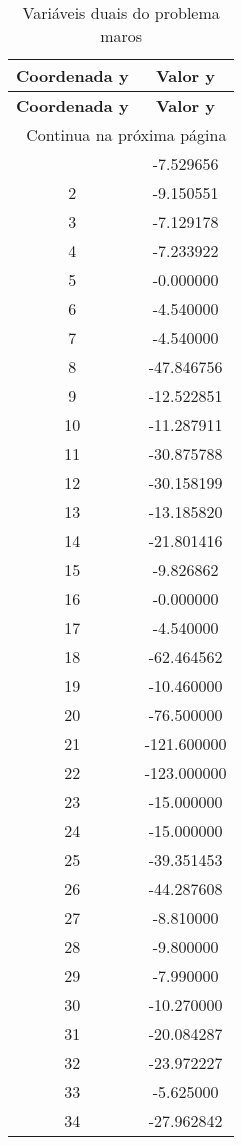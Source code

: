\documentclass[12pt]{article}
\begin{document}
\begin{longtable}{@{}cc@{}}
\caption{Variáveis duais do problema maros} \\
\toprule
\textbf{Coordenada y} & \textbf{Valor y} \\
\midrule
\endfirsthead

\toprule
\textbf{Coordenada y} & \textbf{Valor y} \\
\midrule
\endhead

\midrule \multicolumn{2}{r}{{Continua na próxima página}} \\ \midrule
\endfoot

\bottomrule
\endlastfoot
1 & -7.529656 \\
2 & -9.150551 \\
3 & -7.129178 \\
4 & -7.233922 \\
5 & -0.000000 \\
6 & -4.540000 \\
7 & -4.540000 \\
8 & -47.846756 \\
9 & -12.522851 \\
10 & -11.287911 \\
11 & -30.875788 \\
12 & -30.158199 \\
13 & -13.185820 \\
14 & -21.801416 \\
15 & -9.826862 \\
16 & -0.000000 \\
17 & -4.540000 \\
18 & -62.464562 \\
19 & -10.460000 \\
20 & -76.500000 \\
21 & -121.600000 \\
22 & -123.000000 \\
23 & -15.000000 \\
24 & -15.000000 \\
25 & -39.351453 \\
26 & -44.287608 \\
27 & -8.810000 \\
28 & -9.800000 \\
29 & -7.990000 \\
30 & -10.270000 \\
31 & -20.084287 \\
32 & -23.972227 \\
33 & -5.625000 \\
34 & -27.962842 \\

\end{longtable}
\end{document}
